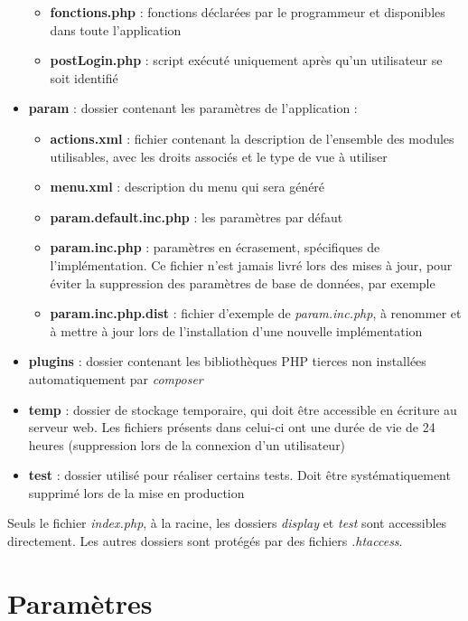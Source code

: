 \begin{itemize}
\begin{itemize}
\item \textbf{fonctions.php} : fonctions déclarées par le programmeur et disponibles dans toute l'application 
\item \textbf{postLogin.php} : script exécuté uniquement après qu'un utilisateur se soit identifié
\end{itemize}
\item \textbf{param} : dossier contenant les paramètres de l'application :
\begin{itemize}
\item \textbf{actions.xml} : fichier contenant la description de l'ensemble des modules utilisables, avec les droits associés et le type de vue à utiliser
\item \textbf{menu.xml} : description du menu qui sera généré
\item \textbf{param.default.inc.php} : les paramètres par défaut
\item \textbf{param.inc.php} : paramètres en écrasement, spécifiques de l'implémentation. Ce fichier n'est jamais livré lors des mises à jour, pour éviter la suppression des paramètres de base de données, par exemple
\item \textbf{param.inc.php.dist} : fichier d'exemple de \textit{param.inc.php}, à renommer et à mettre à jour lors de l'installation d'une nouvelle implémentation
\end{itemize}
\item \textbf{plugins} : dossier contenant les bibliothèques PHP tierces non installées automatiquement par \textit{composer}
\item \textbf{temp} : dossier de stockage temporaire, qui doit être accessible en écriture au serveur web. Les fichiers présents dans celui-ci ont une durée de vie de 24 heures (suppression lors de la connexion d'un utilisateur)
\item \textbf{test} : dossier utilisé pour réaliser certains tests. Doit être systématiquement supprimé lors de la mise en production
\end{itemize}

Seuls le fichier \textit{index.php}, à la racine, les dossiers \textit{display} et \textit{test} sont accessibles directement. Les autres dossiers sont protégés par des fichiers \textit{.htaccess}.

\section{Paramètres}\label{param}

